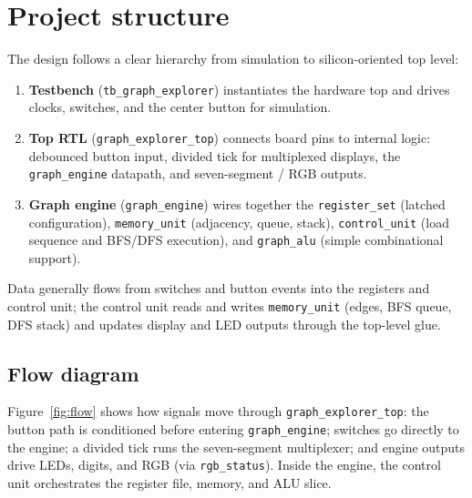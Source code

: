 \documentclass[11pt,a4paper]{article}
\begin{document}
\section{Project structure}

The design follows a clear hierarchy from simulation to silicon-oriented top level:

\begin{enumerate}
  \item \textbf{Testbench} (\texttt{tb\_graph\_explorer}) instantiates the hardware top and drives clocks, switches, and the center button for simulation.
  \item \textbf{Top RTL} (\texttt{graph\_explorer\_top}) connects board pins to internal logic: debounced button input, divided tick for multiplexed displays, the \texttt{graph\_engine} datapath, and seven-segment / RGB outputs.
  \item \textbf{Graph engine} (\texttt{graph\_engine}) wires together the \texttt{register\_set} (latched configuration), \texttt{memory\_unit} (adjacency, queue, stack), \texttt{control\_unit} (load sequence and BFS/DFS execution), and \texttt{graph\_alu} (simple combinational support).
\end{enumerate}

Data generally flows from switches and button events into the registers and control unit; the control unit reads and writes \texttt{memory\_unit} (edges, BFS queue, DFS stack) and updates display and LED outputs through the top-level glue.

\subsection{Flow diagram}

Figure~\ref{fig:flow} shows how signals move through \texttt{graph\_explorer\_top}: the button path is conditioned before entering \texttt{graph\_engine}; switches go directly to the engine; a divided tick runs the seven-segment multiplexer; and engine outputs drive LEDs, digits, and RGB (via \texttt{rgb\_status}). Inside the engine, the control unit orchestrates the register file, memory, and ALU slice.
\end{document}
